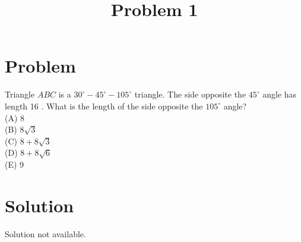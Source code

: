 \documentclass{article}
\title{Problem 1}
\date{}
\begin{document}
\maketitle

\section*{Problem}
Triangle \(A B C\) is a \(30^{\circ}-45^{\circ}-105^{\circ}\) triangle. The side opposite the \(45^{\circ}\) angle has length 16 . What is the length of the side opposite the \(105^{\circ}\) angle?\\
(A) 8\\
(B) \(8 \sqrt{3}\)\\
(C) \(8+8 \sqrt{3}\)\\
(D) \(8+8 \sqrt{6}\)\\
(E) 9

\section*{Solution}
Solution not available.
\end{document}
